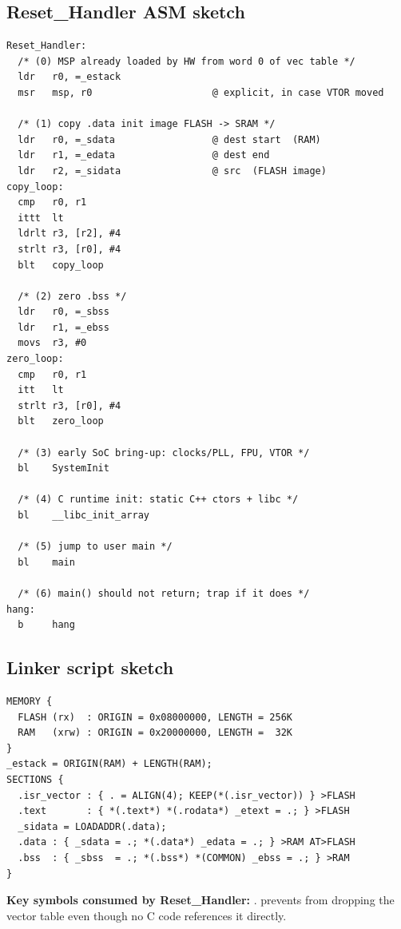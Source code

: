 \subsection{Reset\_Handler ASM sketch}
\begin{lstlisting}
Reset_Handler:
  /* (0) MSP already loaded by HW from word 0 of vec table */
  ldr   r0, =_estack
  msr   msp, r0                     @ explicit, in case VTOR moved

  /* (1) copy .data init image FLASH -> SRAM */
  ldr   r0, =_sdata                 @ dest start  (RAM)
  ldr   r1, =_edata                 @ dest end
  ldr   r2, =_sidata                @ src  (FLASH image)
copy_loop:
  cmp   r0, r1
  ittt  lt
  ldrlt r3, [r2], #4
  strlt r3, [r0], #4
  blt   copy_loop

  /* (2) zero .bss */
  ldr   r0, =_sbss
  ldr   r1, =_ebss
  movs  r3, #0
zero_loop:
  cmp   r0, r1
  itt   lt
  strlt r3, [r0], #4
  blt   zero_loop

  /* (3) early SoC bring-up: clocks/PLL, FPU, VTOR */
  bl    SystemInit

  /* (4) C runtime init: static C++ ctors + libc */
  bl    __libc_init_array

  /* (5) jump to user main */
  bl    main

  /* (6) main() should not return; trap if it does */
hang:
  b     hang
\end{lstlisting}

\subsection{Linker script sketch}
\begin{lstlisting}[language={}]
MEMORY {
  FLASH (rx)  : ORIGIN = 0x08000000, LENGTH = 256K
  RAM   (xrw) : ORIGIN = 0x20000000, LENGTH =  32K
}
_estack = ORIGIN(RAM) + LENGTH(RAM);
SECTIONS {
  .isr_vector : { . = ALIGN(4); KEEP(*(.isr_vector)) } >FLASH
  .text       : { *(.text*) *(.rodata*) _etext = .; } >FLASH
  _sidata = LOADADDR(.data);
  .data : { _sdata = .; *(.data*) _edata = .; } >RAM AT>FLASH
  .bss  : { _sbss  = .; *(.bss*) *(COMMON) _ebss = .; } >RAM
}
\end{lstlisting}
\textbf{Key symbols consumed by Reset\_Handler:} .  prevents  from dropping the vector table even though no C code references it directly.

